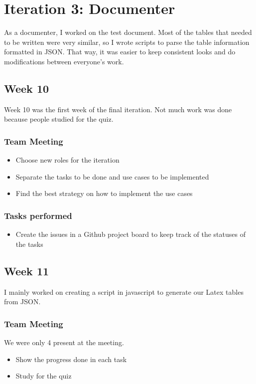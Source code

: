 \documentclass[12pt]{article}
\begin{document}
\section{Iteration 3: Documenter}
As a documenter, I worked on the test document.
Most of the tables that needed to be written were very similar, so I wrote scripts to parse the table information formatted in JSON. That way, it was easier to keep consistent looks and do modifications between everyone's work.

\subsection{Week 10}
Week 10 was the first week of the final iteration.
Not much work was done because people studied for the quiz.

\subsubsection{Team Meeting}
\begin{itemize}
    \item Choose new roles for the iteration
    \item Separate the tasks to be done and use cases to be implemented
    \item Find the best strategy on how to implement the use cases
\end{itemize}

\subsubsection{Tasks performed}
\begin{itemize}
    \item Create the issues in a Github project board to keep track of the statuses of the tasks
\end{itemize}

\subsection{Week 11}
I mainly worked on creating a script in javascript to generate our Latex tables from JSON.

\subsubsection{Team Meeting}

We were only 4 present at the meeting.

\begin{itemize}
    \item Show the progress done in each task
    \item Study for the quiz
\end{itemize}
\end{document}
